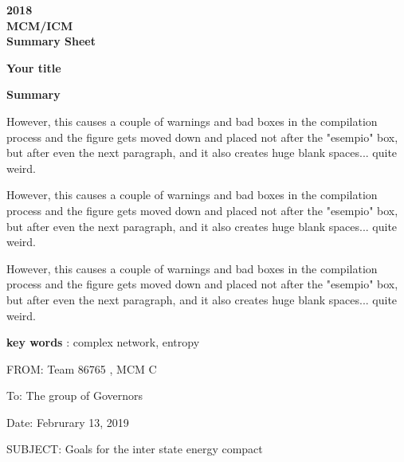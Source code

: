 \documentclass[13pt]{ctexart}
\begin{document}
{ \centering
	\fontsize{14}{10}\selectfont\textbf{2018}\\
	\fontsize{10}{10}\selectfont\textbf{MCM/ICM}\\
	\fontsize{10}{10}\selectfont\textbf{Summary Sheet}\par
}
\vspace{10pt}
{\centering\fontsize{18}{16}\selectfont\textbf{{Your title}}
\vspace{10pt}

\fontsize{13}{10}\selectfont\textbf{{Summary}}\par}

\vspace{10pt}

\fontsize{13}{12.5}\selectfont
\thispagestyle{empty}
\begin{adjustwidth}{2cm}{2cm}
	\indent { }{ }{ }{ }{ }{ }However, this causes a couple of warnings and bad boxes in the compilation process and the figure gets moved down and placed not after the "esempio" box, but after even the next paragraph, and it also creates huge blank spaces... quite weird.
	
	However, this causes a couple of warnings and bad boxes in the compilation process and the figure gets moved down and placed not after the "esempio" box, but after even the next paragraph, and it also creates huge blank spaces... quite weird.
	
	However, this causes a couple of warnings and bad boxes in the compilation process and the figure gets moved down and placed not after the "esempio" box, but after even the next paragraph, and it also creates huge blank spaces... quite weird.
	
	\vspace{15pt}
	\textbf{key words} : complex network, entropy
\end{adjustwidth} 

\newpage
{}
\thispagestyle{empty}
\centering
\vspace{-8pt}
\justifying
{}

\noindent FROM: Team {} 86765 , MCM C

\noindent To: The group of Governors

\noindent Date: Februrary 13, 2019

\noindent SUBJECT: Goals for the inter state energy compact
\end{document}
